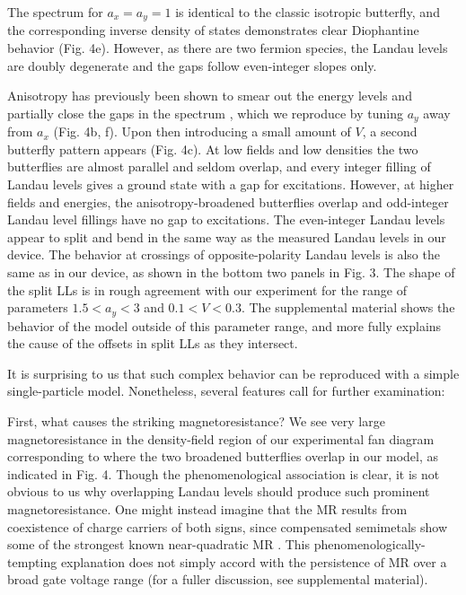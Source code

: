 \documentclass[12pt,twocolumn]{article}
\begin{document}
The spectrum for $a_x=a_y=1$ is identical to the classic isotropic butterfly, and the corresponding inverse density of states demonstrates clear Diophantine behavior (Fig. 4e). However, as there are two fermion species, the Landau levels are doubly degenerate and the gaps follow even-integer slopes only.

Anisotropy has previously been shown to smear out the energy levels and partially close the gaps in the spectrum \cite{barelliMagneticFieldInducedDirectionalLocalization1999,hasegawaStabilizationFluxStates1990,powellDensityWaveStates2019,sunPossibilityQuenchingIntegerquantumHall1991}, which we reproduce by tuning $a_y$ away from $a_x$ (Fig. 4b, f). Upon then introducing a small amount of $V$, a second butterfly pattern appears (Fig. 4c). At low fields and low densities the two butterflies are almost parallel and seldom overlap, and every integer filling of Landau levels gives a ground state with a gap for excitations. However, at higher fields and energies, the anisotropy-broadened butterflies overlap and odd-integer Landau level fillings have no gap to excitations. The even-integer Landau levels appear to split and bend in the same way as the measured Landau levels in our device. The behavior at crossings of opposite-polarity Landau levels is also the same as in our device, as shown in the bottom two panels in Fig. 3. The shape of the split LLs is in rough agreement with our experiment for the range of parameters $1.5 < a_y < 3$ and $0.1 < V < 0.3$. The supplemental material shows the behavior of the model outside of this parameter range, and more fully explains the cause of the offsets in split LLs as they intersect.

It is surprising to us that such complex behavior can be reproduced with a simple single-particle model. Nonetheless, several features call for further examination:

First, what causes the striking magnetoresistance? We see very large magnetoresistance in the density-field region of our experimental fan diagram corresponding to where the two broadened butterflies overlap in our model, as indicated in Fig. 4. Though the phenomenological association is clear, it is not obvious to us why overlapping Landau levels should produce such prominent magnetoresistance. One might instead imagine that the MR results from coexistence of charge carriers of both signs, since compensated semimetals show some of the strongest known near-quadratic MR \cite{aliLargeNonsaturatingMagnetoresistance2014,fatemiMagnetoresistanceQuantumOscillations2017,liangUltrahighMobilityGiant2015}. This phenomenologically-tempting explanation does not simply accord with the persistence of MR over a broad gate voltage range (for a fuller discussion, see supplemental material).
\end{document}
